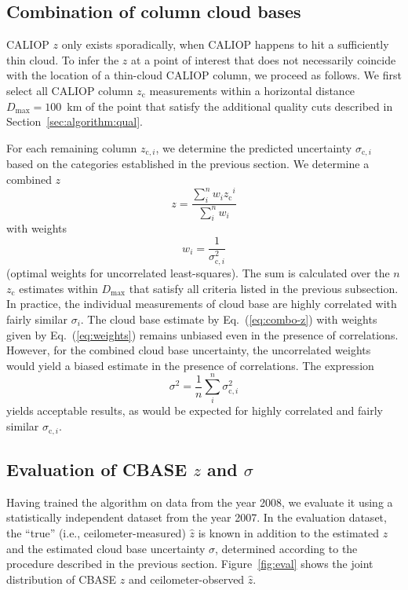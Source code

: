 \documentclass[essd,manuscript]{copernicus}\usepackage[]{graphicx}\usepackage[]{color}
\newcommand\CBH{\ensuremath{z}}
\newcommand\CBHc{\ensuremath{z_\text{c}}}
\begin{document}
\subsection{Combination of column cloud bases}
\label{sec:algorithm:combination}
CALIOP \CBH{} only exists sporadically, 
when CALIOP happens to hit a sufficiently thin cloud.  To infer the \CBH{} at a
point of interest that does not necessarily coincide with the location of
a thin-cloud CALIOP column, we proceed as follows.  We first select all CALIOP
column \CBHc{} measurements within a horizontal distance $D_\text{max} = 100$~\unit{km} of
the point that satisfy the additional quality cuts described in
Section~\ref{sec:algorithm:qual}. 

For each remaining column $\CBH{}_{\text{c},i}$, we determine the predicted
uncertainty $\sigma_{\text{c},i}$ based on the categories established in the previous
section.  We determine a combined \CBH{}
\begin{equation}
  \label{eq:combo-z}
  \CBH = \frac{\sum\limits_i^n w_i \CBHc^i}{\sum\limits_i^n w_i}
\end{equation}
with weights
\begin{equation}
  \label{eq:weights}
  w_i = \frac 1 {\sigma_{\text{c},i}^2}
\end{equation}
(optimal weights for uncorrelated least-squares).  The sum is calculated over
the $n$ \CBHc{} estimates within $D_\text{max}$ that satisfy all criteria listed
in the previous subsection.  In practice, the individual
measurements of cloud base are highly correlated with fairly similar
$\sigma_i$.  The cloud base estimate by Eq.~(\ref{eq:combo-z}) with weights
given by Eq.~(\ref{eq:weights}) remains unbiased even in the presence of
correlations.  However, for the combined cloud base uncertainty,
the uncorrelated weights would yield a biased estimate in the presence of
correlations.  The expression
\begin{equation}
  \label{eq:combo-sigma}
  \sigma^2 = \frac 1 n \sum\limits_i^n \sigma_{\text{c},i}^2
\end{equation}
yields acceptable results, as would be expected for highly correlated and fairly
similar $\sigma_{\text{c},i}$.  

\subsection{Evaluation of CBASE \CBH{} and $\sigma$}
\label{sec:algorithm:eval}

Having trained the algorithm on data from the year 2008, we evaluate it using a
statistically independent dataset from the year 2007.  In the evaluation
dataset, the ``true'' (i.e., ceilometer-measured) $\hat{z}$ is known in
addition to the estimated \CBH{} and the estimated cloud base uncertainty $\sigma$,
determined according to the procedure described in the previous section.
Figure~\ref{fig:eval} shows the joint distribution of CBASE \CBH{} and
ceilometer-observed $\hat{z}$.  
\end{document}
